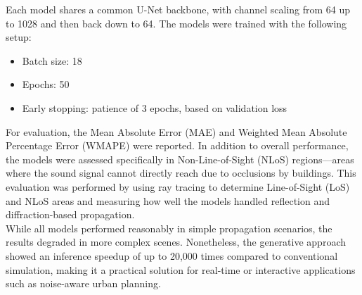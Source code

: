 			Each model shares a common U-Net backbone, with channel scaling from 64 up to 1028 and then back down to 64. The models were trained with the following setup:
			\begin{itemize}[itemsep=1mm, parsep=0pt]
				\item Batch size: 18
				\item Epochs: 50
				\item Early stopping: patience of 3 epochs, based on validation loss
			\end{itemize}
			For evaluation, the Mean Absolute Error (MAE) and Weighted Mean Absolute Percentage Error (WMAPE) were reported. In addition to overall performance, the models were assessed specifically in Non-Line-of-Sight (NLoS) regions—areas where the sound signal cannot directly reach due to occlusions by buildings. This evaluation was performed by using ray tracing to determine Line-of-Sight (LoS) and NLoS areas and measuring how well the models handled reflection and diffraction-based propagation.\\
			While all models performed reasonably in simple propagation scenarios, the results degraded in more complex scenes. Nonetheless, the generative approach showed an inference speedup of up to 20{,}000 times compared to conventional simulation, making it a practical solution for real-time or interactive applications such as noise-aware urban planning.
			
			
